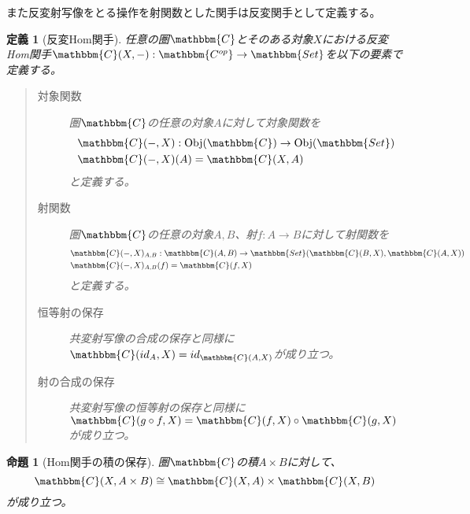 \documentclass[uplatex,dvipdfmx]{jsarticle}
\newcommand{\cat}[1]{\mathbbm{#1}}
\newcommand{\arrow}{\rightarrow}
\newcommand{\functor}[3]{#1:\cat{#2}\arrow \cat{#3}}
\newcommand{\obj}[1]{\mathrm{Obj}(\cat{#1})}
\newcommand{\mor}[3]{#1:#2\arrow #3}
\newcommand{\arset}[3]{\cat{#1}(#2,#3)}
\newtheorem{prop}{命題}[section]
\newtheorem{define}{定義}[section]
\numberwithin{proof}{subsection}
\numberwithin{prop}{subsection}
\numberwithin{define}{subsection}
\begin{document}
	また反変射写像をとる操作を射関数とした関手は反変関手として定義する。
		\begin{define}[反変Hom関手]
		任意の圏$\cat{C}$とそのある対象$X$における反変Hom関手$\functor{\arset{C}{X}{-}}{C^{op}}{Set}$を以下の要素で定義する。
		\begin{quote}
			\begin{description}
				\item[対象関数] 圏$\cat{C}$の任意の対象$A$に対して対象関数を
				\begin{align*}
					&\mor{\arset{C}{-}{X}}{\obj{C}}{\obj{Set}}\\
					&\arset{C}{-}{X}(A)=\arset{C}{X}{A}
				\end{align*}
				と定義する。
				\item[射関数] 圏$\cat{C}$の任意の対象$A,B$、射$\mor{f}{A}{B}$に対して射関数を
				\begin{align*}
					&\mor{\arset{C}{-}{X}_{A,B}}{\arset{C}{A}{B}}{\arset{Set}{\arset{C}{B}{X}}{\arset{C}{A}{X}}}\\
					&\arset{C}{-}{X}_{A,B}(f)=\arset{C}{f}{X}
				\end{align*}
				と定義する。
				\begin{center}
				\end{center}
				\item[恒等射の保存] 共変射写像の合成の保存と同様に$\arset{C}{id_A}{X}=id_{\arset{C}{A}{X}}$が成り立つ。
				\item[射の合成の保存] 共変射写像の恒等射の保存と同様に$\arset{C}{g\circ f}{X}=\arset{C}{f}{X}\circ\arset{C}{g}{X}$が成り立つ。
			\end{description}
		\end{quote}
	\end{define}
	\begin{prop}[Hom関手の積の保存]
		圏$\cat{C}$の積$A\times B$に対して、\[\arset{C}{X}{A\times B}\cong \arset{C}{X}{A}\times \arset{C}{X}{B}\]が成り立つ。
	\end{prop}
\end{document}
